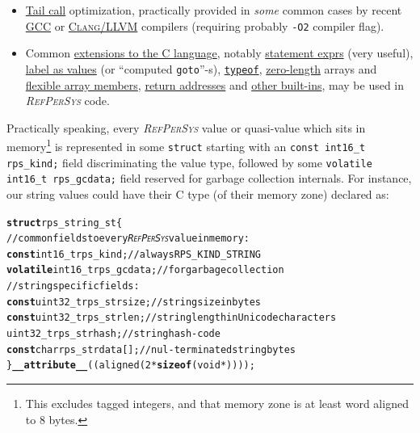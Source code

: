 \documentclass[11pt,a4paper,svgnames]{article}
\newcommand{\RefPerSys}{{\textit{\textsc{RefPerSys}}}}
\begin{document}
\begin{itemize}
    \item \href{https://en.wikipedia.org/wiki/Tail_call}{Tail call}
      optimization, practically provided in \emph{some} common cases
      by recent \href{http://gcc.gnu.org/}{\textsc{GCC}} or
      \href{http://clang.llvm.org/}{\textsc{Clang/LLVM}} compilers
      (requiring probably \texttt{-O2} compiler flag).

      \item Common
        \href{https://gcc.gnu.org/onlinedocs/gcc/C-Extensions.html}{extensions
          to the C language}, notably
        \href{https://gcc.gnu.org/onlinedocs/gcc/Statement-Exprs.html}{statement
          exprs} (very useful),
        \href{https://gcc.gnu.org/onlinedocs/gcc/Labels-as-Values.html}{label
          as values} (or ``computed \texttt{goto}''-s),
        \href{https://gcc.gnu.org/onlinedocs/gcc/Typeof.html#Typeof}{\texttt{typeof}},
        \href{https://gcc.gnu.org/onlinedocs/gcc/Zero-Length.html}{zero-length}
        arrays and
        \href{https://en.wikipedia.org/wiki/Flexible\_array\_member}{flexible
          array members},
        \href{https://gcc.gnu.org/onlinedocs/gcc/Return-Address.html}{return
          addresses} and
        \href{https://gcc.gnu.org/onlinedocs/gcc/Other-Builtins.html}{other
          built-ins}, may be used in {\RefPerSys} code.
\end{itemize}

\smallskip

Practically speaking, every {\RefPerSys} value or quasi-value which
sits in memory\footnote{This excludes tagged integers, and that memory
zone is at least word aligned to 8 bytes.} is represented in some
\texttt{struct} starting with an \texttt{const int16\_t rps\_kind;}
field discriminating the value type, followed by some \texttt{volatile
  int16\_t rps\_gcdata;} field reserved for garbage collection
internals. For instance, our string values could have their C type (of their memory zone) declared as:
\begin{relsize}{-1.5}
\begin{alltt}
  \textbf{struct} rps\_string\_st \{
    // common fields to every {\RefPerSys} value in memory:
    \textbf{const} int16\_t rps\_kind;      // always RPS\_KIND\_STRING
    \textbf{volatile} int16\_t rps\_gcdata; // for garbage collection
    // string specific fields:
    \textbf{const} uint32\_t rps\_strsize;      // string size in bytes
    \textbf{const} uint32\_t rps\_strlen;       // string length in Unicode characters
    uint32\_t rps\_strhash;            // string hash-code
    \textbf{const} char rps\_strdata[];        // nul-terminated string bytes
  \}  \textbf{\_\_attribute\_\_} ((aligned (2 * \textbf{sizeof}(void*))));
\end{alltt}
\end{relsize}
\end{document}
